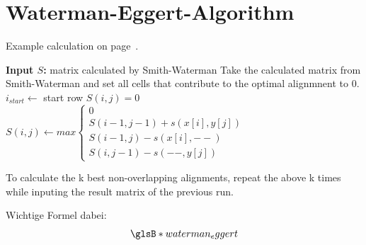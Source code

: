 \newpage

\section{Waterman-Eggert-Algorithm}

Example calculation on page~\pageref{sec:waterman-eggert-example}.

\begin{algorithm}
    \caption{ONE(!) suboptimal Alignment through Waterman-Eggert}
    \begin{algorithmic}
        \Statex \textbf{Input $S$:} matrix calculated by Smith-Waterman
        \State Take the calculated matrix from Smith-Waterman and set all cells that contribute to the optimal alignmnent to 0.
        \State $i_{start} \gets $ start row
                    \State $S(i,j) = 0$
                \Else
                    \State $S(i,j) \gets max \begin{cases}
                                                 0   \\
                                                 S(i - 1, j - 1) + s(x[i], y[j])  \\
                                                 S(i - 1, j) - s(x[i], --)  \\
                                                 S(i, j - 1) - s(--, y[j])
                    \end{cases}$
                \EndIf
            \EndFor
        \EndFor
    \end{algorithmic}\label{alg:waterman_eggert}
\end{algorithm}

To calculate the k best non-overlapping alignments, repeat the above k times while inputing the result matrix of the previous run.

Wichtige Formel dabei:
\begin{equation}\label{eq:waterman_eggert}
    \glsB*{waterman_eggert}
\end{equation}
